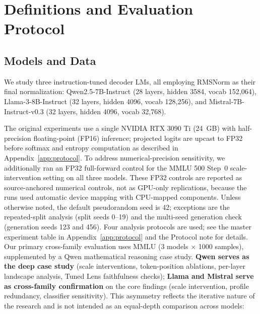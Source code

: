 \documentclass{ieeeaccess}
\begin{document}
\section{Definitions and Evaluation Protocol}
\label{sec:definitions}

\subsection{Models and Data}

We study three instruction-tuned decoder LMs, all employing RMSNorm as their final normalization: Qwen2.5-7B-Instruct \cite{qwen2024report} (28 layers, hidden 3584, vocab 152,064), Llama-3-8B-Instruct \cite{grattafiori2024llama3} (32 layers, hidden 4096, vocab 128,256), and Mistral-7B-Instruct-v0.3 \cite{jiang2023mistral} (32 layers, hidden 4096, vocab 32,768).

The original experiments use a single NVIDIA RTX 3090 Ti (24~GB) with half-precision floating-point (FP16) inference; projected logits are upcast to FP32 before softmax and entropy computation as described in Appendix~\ref{app:protocol}. To address numerical-precision sensitivity, we additionally ran an FP32 full-forward control for the MMLU 500 Step~0 scale-intervention setting on all three models. These FP32 controls are reported as source-anchored numerical controls, not as GPU-only replications, because the runs used automatic device mapping with CPU-mapped components. Unless otherwise noted, the default pseudorandom seed is 42; exceptions are the repeated-split analysis (split seeds 0--19) and the multi-seed generation check (generation seeds 123 and 456). Four analysis protocols are used; see the master experiment table in Appendix~\ref{app:protocol} and the Protocol note for details. Our primary cross-family evaluation uses MMLU (3 models $\times$ 1000 samples), supplemented by a Qwen mathematical reasoning case study. \textbf{Qwen serves as the deep case study} (scale interventions, token-position ablations, per-layer landscape analysis, Tuned Lens faithfulness checks); \textbf{Llama and Mistral serve as cross-family confirmation} on the core findings (scale intervention, profile redundancy, classifier sensitivity). This asymmetry reflects the iterative nature of the research and is not intended as an equal-depth comparison across models:
\end{document}
